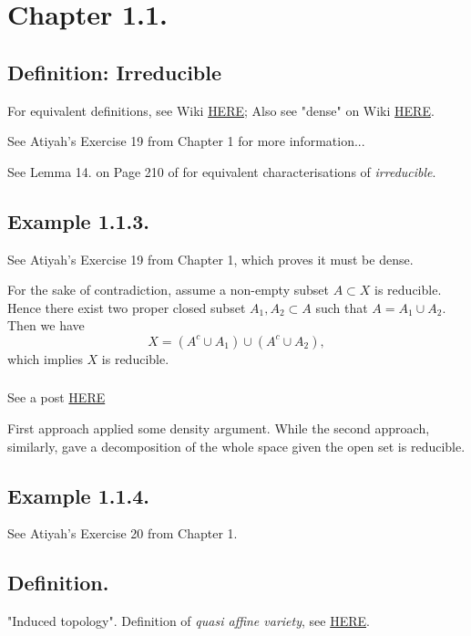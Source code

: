 \chapter{Chapter 1.1.}

\section{Definition: Irreducible}

For equivalent definitions, see Wiki \href{https://en.wikipedia.org/wiki/Irreducible_component}{HERE};
Also see "dense" on Wiki \href{https://en.wikipedia.org/wiki/Dense_set}{HERE}.

See Atiyah's \cite{atiyah1994introduction} Exercise 19 from Chapter 1 for more information...

See Lemma 14. on Page 210 of \cite{bosch2013algebraic} for equivalent characterisations of \textit{irreducible}.

\section{Example 1.1.3.}
See Atiyah's \cite{atiyah1994introduction} Exercise 19 from Chapter 1, which proves it must be dense.

For the sake of contradiction, assume a non-empty subset $A\subset X$ is reducible. Hence there exist two proper closed subset $A_1,A_2\subset A$ such that $A=A_1\cup A_2$.
Then we have $$X=(A^c\cup A_1)\cup (A^c\cup A_2),$$ which implies $X$ is reducible. 
\subsection{}
See a post \href{https://math.stackexchange.com/questions/460074/an-open-subset-of-an-irreducible-set-is-dense}{HERE} 

First approach applied some density argument. While the second approach, similarly, gave a decomposition of the whole space given the open set is reducible.

\section{Example 1.1.4.}

See Atiyah's \cite{atiyah1994introduction} Exercise 20 from Chapter 1.

\section{Definition.} 
"Induced topology". Definition of \textit{quasi affine variety}, see \href{https://math.stackexchange.com/questions/1086839/a-confusion-regarding-the-definition-of-a-quasi-affine-variety}{HERE}.

